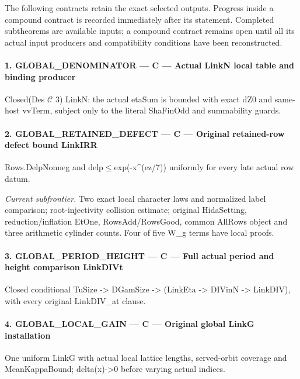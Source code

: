 The following contracts retain the exact selected outputs. Progress
inside a compound contract is recorded immediately after its statement.
Completed subtheorems are available inputs; a compound contract remains
open until all its actual input producers and compatibility conditions
have been reconstructed.
\paragraph{1. GLOBAL\_\allowbreak{}DENOMINATOR — C — Actual LinkN local table and binding producer}

Closed(Des $\mathcal C$ 3) LinkN: the actual etaSum is bounded with exact dZ0 and same-host vvTerm, subject only to the literal ShaFinOdd and summability guards.


\paragraph{2. GLOBAL\_\allowbreak{}RETAINED\_\allowbreak{}DEFECT — C — Original retained-row defect bound LinkIRR}

Rows.DelpNonneg and delp$\le$exp(-x\textasciicircum{}(ez/\allowbreak{}7)) uniformly for every late actual row datum.


\emph{Current subfrontier.} Two exact local character laws and normalized label comparison; root-injectivity collision estimate; original HidaSetting, reduction/inflation EtOne, RowsAdd/RowsGood, common AllRows object and three arithmetic cylinder counts. Four of five W\_\allowbreak g terms have local proofs.


\paragraph{3. GLOBAL\_\allowbreak{}PERIOD\_\allowbreak{}HEIGHT — C — Full actual period and height comparison LinkDIVt}

Closed conditional TuSize -> DGamSize -> (LinkEta -> DIVinN -> LinkDIV), with every original LinkDIV\_\allowbreak{}at clause.


\paragraph{4. GLOBAL\_\allowbreak{}LOCAL\_\allowbreak{}GAIN — C — Original global LinkG installation}

One uniform LinkG with actual local lattice lengths, served-orbit coverage and MeanKappaBound; delta(x)->0 before varying actual indices.


